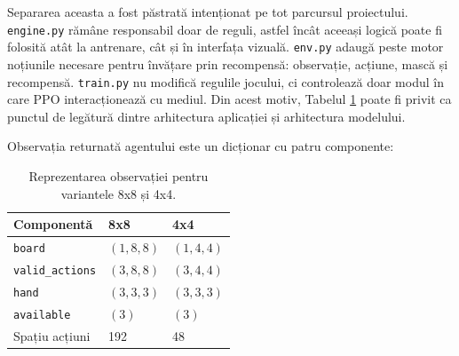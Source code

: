 \documentclass[12pt,a4paper]{article}
\begin{document}
\begin{table}[H]
    \centering
    \caption{Rolul principal al fișierelor din proiect.}
    \label{tab:file-roles}
\end{table}

Separarea aceasta a fost păstrată intenționat pe tot parcursul proiectului. \texttt{engine.py} rămâne responsabil doar de reguli, astfel încât aceeași logică poate fi folosită atât la antrenare, cât și în interfața vizuală. \texttt{env.py} adaugă peste motor noțiunile necesare pentru învățare prin recompensă: observație, acțiune, mască și recompensă. \texttt{train.py} nu modifică regulile jocului, ci controlează doar modul în care PPO interacționează cu mediul. Din acest motiv, Tabelul \ref{tab:observations} poate fi privit ca punctul de legătură dintre arhitectura aplicației și arhitectura modelului.

Observația returnată agentului este un dicționar cu patru componente:

\begin{table}[H]
    \centering
    \caption{Reprezentarea observației pentru variantele 8x8 și 4x4.}
    \label{tab:observations}
    \begin{tabular}{lll}
        \toprule
        Componentă & 8x8 & 4x4 \\
        \midrule
        \texttt{board} & $(1,8,8)$ & $(1,4,4)$ \\
        \texttt{valid\_actions} & $(3,8,8)$ & $(3,4,4)$ \\
        \texttt{hand} & $(3,3,3)$ & $(3,3,3)$ \\
        \texttt{available} & $(3)$ & $(3)$ \\
        Spațiu acțiuni & 192 & 48 \\
        \bottomrule
    \end{tabular}
\end{table}
\end{document}
